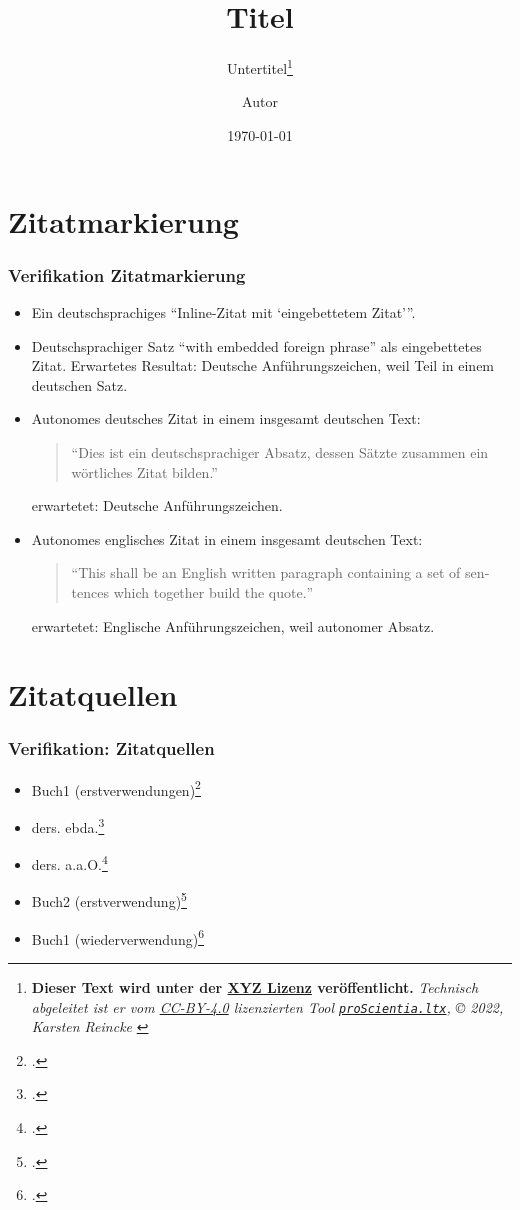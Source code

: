 \documentclass[]{beamer}
\title{Titel}
\subtitle{Untertitel\footnote{\tiny{
  \textbf{Dieser Text wird unter der \href{https://creativecommons.org/}{XYZ Lizenz} veröffentlicht.}
\textit{\textrm{Technisch abgeleitet ist er vom \href{https://creativecommons.org/licenses/by/4.0/}{CC-BY-4.0} lizenzierten Tool \texttt{\href{https://github.com/kreincke/proScientia.ltx}{proScientia.ltx}}, \copyright{} 2022, Karsten Reincke }}
  }}}
\institute{Institute}
\author{Autor}
\date{\today}
\begin{document}
\begin{frame}
  \titlepage
\end{frame}

\section{Zitatmarkierung}

\begin{frame}
  \frametitle{Verifikation Zitatmarkierung}
  \begin{itemize}

    \item Ein deutschsprachiges \enquote{Inline-Zitat mit \enquote{eingebettetem Zitat}}.
  
    \item Deutschsprachiger Satz \foreignquote{german}{with embedded foreign phrase}
    als eingebettetes Zitat. Erwartetes Resultat: Deutsche Anführungszeichen,
    weil Teil in einem deutschen Satz.

    \item Autonomes deutsches Zitat in einem insgesamt deutschen Text:
    \newline \newline
    \begin{quote}
      \textrm{\enquote{Dies ist ein deutschsprachiger Absatz, dessen Sätzte zusammen
      ein wörtliches Zitat bilden.}}
    \end{quote}
    erwartetet: Deutsche Anführungszeichen.
  
    \item Autonomes englisches Zitat in einem insgesamt deutschen Text:
    \newline \newline
    \begin{quote}
      \textrm{\foreignquote{english}{This shall be an English written paragraph containing
      a set of sentences which together build the quote.}}
    \end{quote}
    erwartetet: Englische Anführungszeichen, weil autonomer Absatz.
  \end{itemize}

\end{frame}

\section{Zitatquellen}
\begin{frame}
  \frametitle{Verifikation: Zitatquellen}
  \begin{itemize}
    \item Buch1 (erstverwendungen)\footcite[vgl.][15]{KantKdrV1974}
    \item ders. ebda.\footcite[vgl.][15]{KantKdrV1974}
    \item ders. a.a.O.\footcite[vgl.][23]{KantKdrV1974}
    \item Buch2 (erstverwendung)\footcite[vgl.][15]{KantKdU1974}
    \item Buch1 (wiederverwendung)\footcite[vgl.][15]{KantKdrV1974}
  \end{itemize}

\end{frame}
\end{document}

